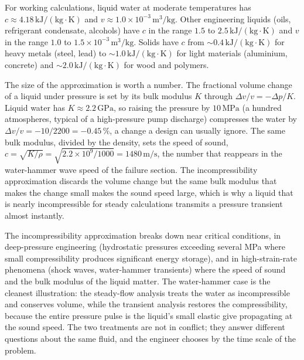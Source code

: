 For working calculations, liquid water at moderate temperatures has
$c \approx 4.18\,\text{kJ}/(\text{kg}\cdot\si{\kelvin})$ and $v
\approx 1.0 \times 10^{-3}\,\text{m}^3/\text{kg}$. Other engineering
liquids (oils, refrigerant condensate, alcohols) have $c$ in the
range $1.5$ to $2.5\,\text{kJ}/(\text{kg}\cdot\si{\kelvin})$ and $v$
in the range $1.0$ to $1.5 \times 10^{-3}\,\text{m}^3/\text{kg}$.
Solids have $c$ from $\sim 0.4\,\text{kJ}/(\text{kg}\cdot\si{\kelvin})$
for heavy metals (steel, lead) to $\sim 1.0\,\text{kJ}/(\text{kg}
\cdot\si{\kelvin})$ for light materials (aluminium, concrete) and
$\sim 2.0\,\text{kJ}/(\text{kg}\cdot\si{\kelvin})$ for wood and
polymers.

The size of the approximation is worth a number. The fractional volume
change of a liquid under pressure is set by its bulk modulus $K$ through
$\Delta v/v = -\Delta p/K$. Liquid water has $K \approx 2.2\,\text{GPa}$,
so raising the pressure by $10\,\text{MPa}$ (a hundred atmospheres,
typical of a high-pressure pump discharge) compresses the water by
$\Delta v/v = -10/2200 = -0.45\,\%$, a change a design can usually
ignore. The same bulk modulus, divided by the density, sets the speed of
sound, $c = \sqrt{K/\rho} = \sqrt{2.2\times 10^9/1000} = 1480\,\text{m}/
\text{s}$, the number that reappears in the water-hammer wave speed of
the failure section. The incompressibility approximation discards the
volume change but the same bulk modulus that makes the change small makes
the sound speed large, which is why a liquid that is nearly
incompressible for steady calculations transmits a pressure transient
almost instantly.

The incompressibility approximation breaks down near critical
conditions, in deep-pressure engineering (hydrostatic pressures
exceeding several MPa where small compressibility produces
significant energy storage), and in high-strain-rate phenomena
(shock waves, water-hammer transients) where the speed of sound and
the bulk modulus of the liquid matter. The water-hammer case is the
cleanest illustration: the steady-flow analysis treats the water as
incompressible and conserves volume, while the transient analysis
restores the compressibility, because the entire pressure pulse is the
liquid's small elastic give propagating at the sound speed. The two
treatments are not in conflict; they answer different questions about the
same fluid, and the engineer chooses by the time scale of the problem.

